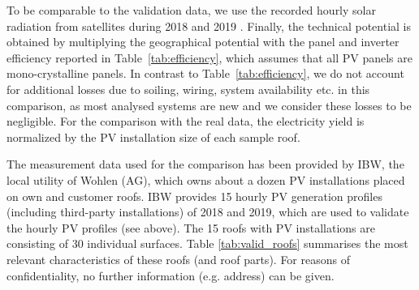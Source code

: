 To be comparable to the validation data, we use the recorded hourly solar radiation from satellites during 2018 and 2019 \cite{stockli_daily_2013}.
Finally, the technical potential is obtained by multiplying the geographical potential with the panel and inverter efficiency reported in Table~\ref{tab:efficiency}, which assumes that all PV panels are mono-crystalline panels. In contrast to Table~\ref{tab:efficiency}, we do not account for additional losses due to soiling, wiring, system availability etc. in this comparison, as most analysed systems are new and we consider these losses to be negligible. For the comparison with the real data, the electricity yield is normalized by the PV installation size of each sample roof.

The measurement data used for the comparison has been provided by IBW, the local utility of Wohlen (AG), which owns about a dozen PV installations placed on own and customer roofs. IBW provides 15 hourly PV generation profiles (including third-party installations) of 2018 and 2019, which are used to validate the hourly PV profiles (see above). The 15 roofs with PV installations are consisting of 30 individual surfaces. 
Table \ref{tab:valid_roofs} summarises the most relevant characteristics of these roofs (and roof parts). For reasons of confidentiality, no further information (e.g. address) can be given.  

